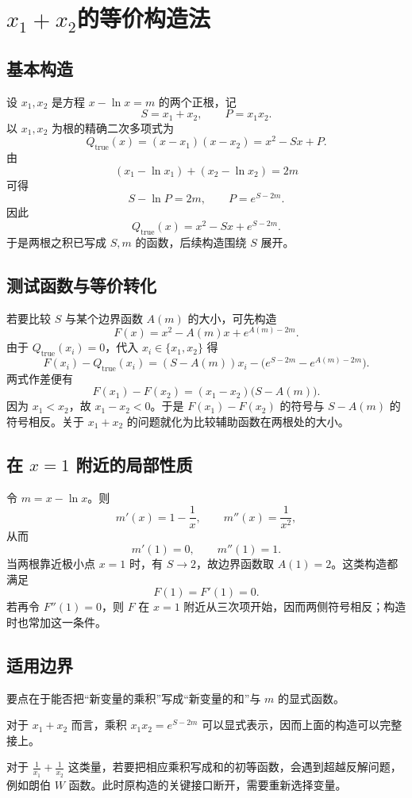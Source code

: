 \chapter{\texorpdfstring{$x_1+x_2$的等价构造法}{x1+x2的等价构造法}}

\section{基本构造}
设 \(x_1,x_2\) 是方程 \(x-\ln x=m\) 的两个正根，记
\[
S=x_1+x_2,\qquad P=x_1x_2.
\]
以 \(x_1,x_2\) 为根的精确二次多项式为
\[
Q_{\mathrm{true}}(x)=(x-x_1)(x-x_2)=x^2-Sx+P.
\]
由
\[
(x_1-\ln x_1)+(x_2-\ln x_2)=2m
\]
可得
\[
S-\ln P=2m,\qquad P=e^{S-2m}.
\]
因此
\[
Q_{\mathrm{true}}(x)=x^2-Sx+e^{S-2m}.
\]
于是两根之积已写成 \(S,m\) 的函数，后续构造围绕 \(S\) 展开。

\section{测试函数与等价转化}
若要比较 \(S\) 与某个边界函数 \(A(m)\) 的大小，可先构造
\[
F(x)=x^2-A(m)x+e^{A(m)-2m}.
\]
由于 \(Q_{\mathrm{true}}(x_i)=0\)，代入 \(x_i\in\{x_1,x_2\}\) 得
\[
F(x_i)-Q_{\mathrm{true}}(x_i)=(S-A(m))x_i-\bigl(e^{S-2m}-e^{A(m)-2m}\bigr).
\]
两式作差便有
\[
F(x_1)-F(x_2)=(x_1-x_2)\bigl(S-A(m)\bigr).
\]
因为 \(x_1<x_2\)，故 \(x_1-x_2<0\)。于是 \(F(x_1)-F(x_2)\) 的符号与 \(S-A(m)\) 的符号相反。关于 \(x_1+x_2\) 的问题就化为比较辅助函数在两根处的大小。

\section{\texorpdfstring{在 \(x=1\) 附近的局部性质}{在 x=1 附近的局部性质}}
令 \(m=x-\ln x\)。则
\[
m'(x)=1-\frac1x,\qquad m''(x)=\frac1{x^2},
\]
从而
\[
m'(1)=0,\qquad m''(1)=1.
\]
当两根靠近极小点 \(x=1\) 时，有 \(S\to2\)，故边界函数取 \(A(1)=2\)。这类构造都满足
\[
F(1)=F'(1)=0.
\]
若再令 \(F''(1)=0\)，则 \(F\) 在 \(x=1\) 附近从三次项开始，因而两侧符号相反；构造时也常加这一条件。

\section{适用边界}
要点在于能否把“新变量的乘积”写成“新变量的和”与 \(m\) 的显式函数。

对于 \(x_1+x_2\) 而言，乘积 \(x_1x_2=e^{S-2m}\) 可以显式表示，因而上面的构造可以完整接上。

对于 \(\frac1{x_1}+\frac1{x_2}\) 这类量，若要把相应乘积写成和的初等函数，会遇到超越反解问题，例如朗伯 \(W\) 函数。此时原构造的关键接口断开，需要重新选择变量。

